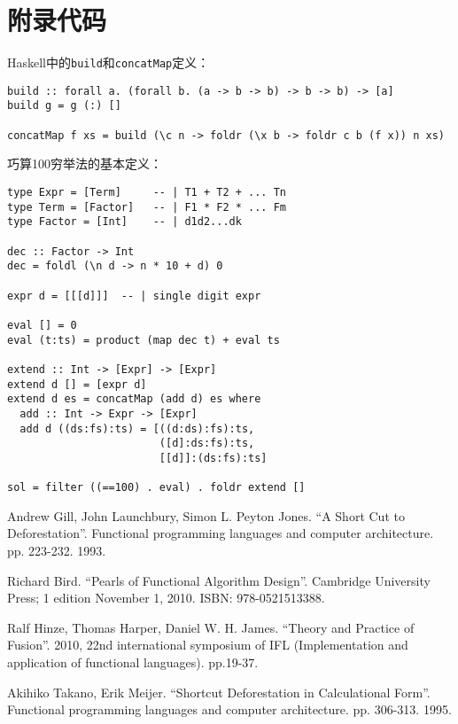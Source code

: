 \documentclass{article}
\begin{document}
\begin{Exercise}
\end{Exercise}

\section{附录代码}

Haskell中的\texttt{build}和\texttt{concatMap}定义：

\lstset{frame=single}
\begin{lstlisting}
build :: forall a. (forall b. (a -> b -> b) -> b -> b) -> [a]
build g = g (:) []

concatMap f xs = build (\c n -> foldr (\x b -> foldr c b (f x)) n xs)
\end{lstlisting}

巧算100穷举法的基本定义：
\begin{lstlisting}
type Expr = [Term]     -- | T1 + T2 + ... Tn
type Term = [Factor]   -- | F1 * F2 * ... Fm
type Factor = [Int]    -- | d1d2...dk

dec :: Factor -> Int
dec = foldl (\n d -> n * 10 + d) 0

expr d = [[[d]]]  -- | single digit expr

eval [] = 0
eval (t:ts) = product (map dec t) + eval ts

extend :: Int -> [Expr] -> [Expr]
extend d [] = [expr d]
extend d es = concatMap (add d) es where
  add :: Int -> Expr -> [Expr]
  add d ((ds:fs):ts) = [((d:ds):fs):ts,
                        ([d]:ds:fs):ts,
                        [[d]]:(ds:fs):ts]

sol = filter ((==100) . eval) . foldr extend []
\end{lstlisting}

\ifx\wholebook\relax \else
\begin{thebibliography}{99}

Andrew Gill, John Launchbury, Simon L. Peyton Jones. ``A Short Cut to Deforestation''. Functional programming languages and computer architecture. pp. 223-232. 1993.

Richard Bird. ``Pearls of Functional Algorithm Design''. Cambridge University Press; 1 edition November 1, 2010. ISBN: 978-0521513388.

Ralf Hinze, Thomas Harper, Daniel W. H. James. ``Theory and Practice of Fusion''. 2010, 22nd international symposium of IFL (Implementation and application of functional languages). pp.19-37.

Akihiko Takano, Erik Meijer. ``Shortcut Deforestation in Calculational Form''. Functional programming languages and computer architecture. pp. 306-313. 1995.

\end{thebibliography}

\expandafter\enddocument

\fi
\end{document}
